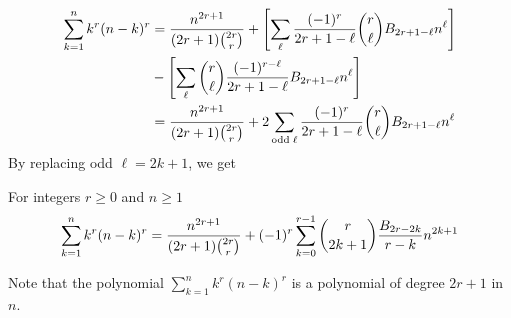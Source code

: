 \begin{align*}
    \sum_{k=1}^{n} k^{r} (n-k)^{r}
    &= \frac{n^{2r+1}}{(2r+1) \binom{2r}r}
    + \left[ \sum_{\ell} \frac{(-1)^r}{2r+1-\ell} \binom{r}{\ell} {B}\sb{2r+1-\ell} n^{\ell} \right] \\
    &- \left[ \sum_{\ell} \binom{r}{\ell} \frac{(-1)^{r-\ell}}{2r+1-\ell} {B}\sb{2r+1-\ell} n^{\ell} \right]\\
    &= \frac{n^{2r+1}}{(2r+1) \binom{2r}r} + 2 \sum_{\mathrm{odd \; \ell}} \frac{(-1)^r}{2r+1-\ell} \binom{r}{\ell} {B}\sb{2r+1-\ell} n^{\ell}
\end{align*}
By replacing odd $\ell = 2k+1$, we get
\begin{proposition}
    For integers $r \geq 0$ and $n \geq 1$
    \label{prop:bivariate-faulhabers-formula}
    \begin{align*}
        \sum_{k=1}^{n} k^{r} (n-k)^{r}
        = \frac{n^{2r+1}}{(2r+1) \binom{2r}{r}}
        + (-1)^r \sum_{k=0}^{r-1} \binom{r}{2k+1} \frac{{B}\sb{2r-2k}}{r-k} n^{2k+1}
    \end{align*}
\end{proposition}
Note that the polynomial $\sum_{k=1}^{n} k^r (n-k)^r$ is a polynomial of degree $2r+1$ in $n$.

